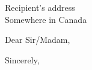 \documentclass{dcsletter}
\begin{document}

\begin{letter}
   {Recipient's address\\
    Somewhere in Canada}

\enlargethispage{-2\baselineskip}
\rule{0pt}{.5in}

\RaggedRight

\opening{Dear Sir/Madam,}



\closing{Sincerely,}

\end{letter}
\end{document}
